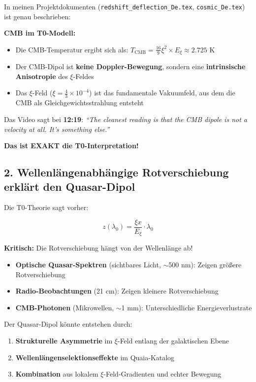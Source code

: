 \documentclass{article}
\begin{document}
	In meinen Projektdokumenten (\texttt{redshift\_deflection\_De.tex}, \texttt{cosmic\_De.tex}) ist genau beschrieben:
	
	\textbf{CMB im T0-Modell:}
	\begin{itemize}
		\item Die CMB-Temperatur ergibt sich als: $T_{\text{CMB}} = \frac{16}{9} \xi^2 \times E_\xi \approx 2.725$ K
		\item Der CMB-Dipol ist \textbf{keine Doppler-Bewegung}, sondern eine \textbf{intrinsische Anisotropie} des $\xi$-Feldes
		\item Das $\xi$-Feld ($\xi = \frac{4}{3} \times 10^{-4}$) ist das fundamentale Vakuumfeld, aus dem die CMB als Gleichgewichtsstrahlung entsteht
	\end{itemize}
	
	Das Video sagt bei \textbf{12:19}: \textit{``The cleanest reading is that the CMB dipole is not a velocity at all. It's something else.''}
	
	\textbf{Das ist EXAKT die T0-Interpretation!}
	
	\subsection{2. Wellenlängenabhängige Rotverschiebung erklärt den Quasar-Dipol}
	
	Die T0-Theorie sagt vorher:
	
	$$z(\lambda_0) = \frac{\xi x}{E_\xi} \cdot \lambda_0$$
	
	\textbf{Kritisch:} Die Rotverschiebung hängt von der Wellenlänge ab!
	
	\begin{itemize}
		\item \textbf{Optische Quasar-Spektren} (sichtbares Licht, $\sim$500 nm): Zeigen größere Rotverschiebung
		\item \textbf{Radio-Beobachtungen} (21 cm): Zeigen kleinere Rotverschiebung
		\item \textbf{CMB-Photonen} (Mikrowellen, $\sim$1 mm): Unterschiedliche Energieverlustrate
	\end{itemize}
	
	Der Quasar-Dipol könnte entstehen durch:
	\begin{enumerate}
		\item \textbf{Strukturelle Asymmetrie} im $\xi$-Feld entlang der galaktischen Ebene
		\item \textbf{Wellenlängenselektionseffekte} im Quaia-Katalog \cite{storey2024}
		\item \textbf{Kombination} aus lokalem $\xi$-Feld-Gradienten und echter Bewegung
	\end{enumerate}
	
\end{document}
